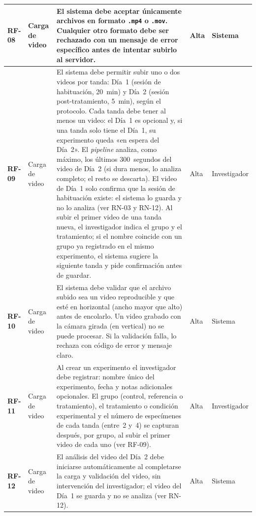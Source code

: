 \begin{longtable}{|>{\bfseries}p{1.1cm}|>{\raggedright}p{2.8cm}|>{\raggedright\arraybackslash}p{5.7cm}|p{1.3cm}|p{2.2cm}|}
RF-08 & Carga de video
      & El sistema debe aceptar únicamente archivos en formato \texttt{.mp4} o
        \texttt{.mov}. Cualquier otro formato debe ser rechazado con un mensaje de
        error específico antes de intentar subirlo al servidor.
      & Alta & Sistema \\
\hline
RF-09 & Carga de video
      & El sistema debe permitir subir uno o dos videos por tanda: Día~1
        (sesión de habituación, 20~min) y Día~2 (sesión post-tratamiento, 5~min), según el protocolo. Cada
        tanda debe tener al menos un video: el Día~1 es opcional y, si una tanda solo
        tiene el Día~1, su experimento queda «en espera del Día~2». El \textit{pipeline} analiza, como máximo, los últimos
        300~segundos del video de Día~2 (si dura menos, lo analiza completo; el resto
        se descarta). El video de Día~1 solo confirma que la sesión de habituación
        existe: el sistema lo guarda y no lo analiza (ver RN-03 y RN-12). Al subir el
        primer video de una tanda nueva, el investigador indica el grupo y el
        tratamiento; si el nombre coincide con un grupo ya registrado en el mismo
        experimento, el sistema sugiere la siguiente tanda y pide confirmación
        antes de guardar.
      & Alta & Investigador \\
\hline
RF-10 & Carga de video
      & El sistema debe validar que el archivo subido sea un video reproducible y que
        esté en horizontal (ancho mayor que alto) antes de encolarlo. Un video grabado
        con la cámara girada (en vertical) no se puede procesar. Si la validación
        falla, lo rechaza con código de error y mensaje claro.
      & Alta & Sistema \\
\hline
RF-11 & Carga de video
      & Al crear un experimento el investigador debe registrar: nombre único del
        experimento, fecha y notas adicionales opcionales. El grupo (control,
        referencia o tratamiento), el tratamiento o condición experimental y el
        número de especímenes de cada tanda (entre~2 y~4) se capturan después,
        por grupo, al subir el primer video de cada uno (ver RF-09).
      & Alta & Investigador \\
\hline
RF-12 & Carga de video
      & El análisis del video del Día~2 debe iniciarse automáticamente al completarse la
        carga y validación del video, sin intervención del investigador; el video del
        Día~1 se guarda y no se analiza (ver RN-12).
      & Alta & Sistema \\
\hline


\end{longtable}
